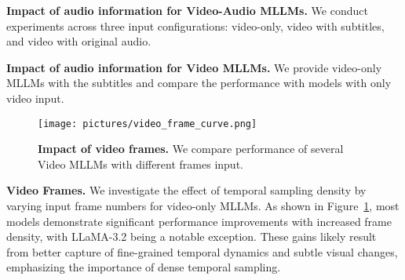 \begin{table*}[t]
  \label{tab:ablations}
  \centering
  
  \begin{minipage}{\textwidth}
    \centering
    \caption{\textbf{Impact of audio information for Video-Audio MLLMs.} We conduct experiments across three input configurations: video-only, video with subtitles, and video with original audio.}
    \label{tab:ablation_audio}
    \begin{adjustbox}{width=\textwidth}
      
    \end{adjustbox}
  \end{minipage}  
  \hfill
  \vspace{6mm}
  \begin{minipage}{\textwidth}
    \centering
    \caption{\textbf{Impact of audio information for Video MLLMs.} We provide video-only MLLMs with the subtitles and compare the performance with models with only video input.}
    \label{tab:ablation_audio_v}
    \tiny
    \renewcommand{\arraystretch}{0.2}
    \begin{adjustbox}{width=\textwidth}
      
    \end{adjustbox}
  \end{minipage}
\end{table*}

\begin{figure}
  \centering
  \texttt{[image: pictures/video\_frame\_curve.png]}
  \caption{\textbf{Impact of video frames.} We compare performance of several Video MLLMs with different frames input.}
  \label{fig:ablation_video_frame}
  \vspace{-6mm}
\end{figure}

\textbf{Video Frames.} 
We investigate the effect of temporal sampling density by varying input frame numbers for video-only MLLMs. As shown in Figure~\ref{fig:ablation_video_frame}, most models demonstrate significant performance improvements with increased frame density, with LLaMA-3.2 being a notable exception. These gains likely result from better capture of fine-grained temporal dynamics and subtle visual changes, emphasizing the importance of dense temporal sampling.




